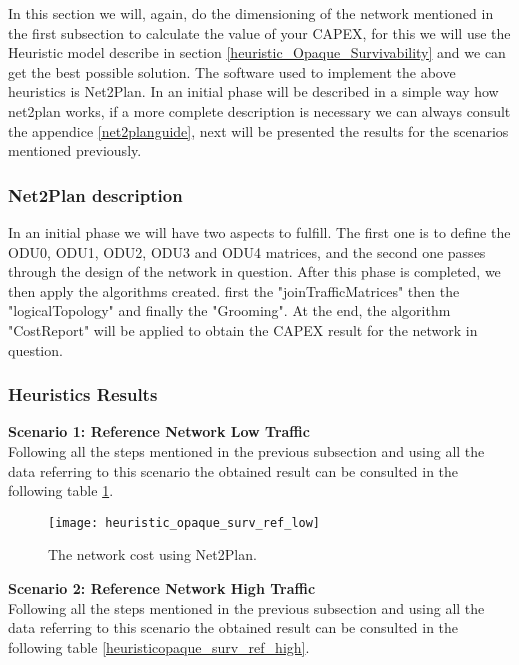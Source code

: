 \vspace{11pt}
In this section we will, again, do the dimensioning of the network mentioned in the first subsection to calculate the value of your CAPEX, for this we will use the Heuristic model describe in section \ref{heuristic_Opaque_Survivability} and we can get the best possible solution.
The software used to implement the above heuristics is Net2Plan.
In an initial phase will be described in a simple way how net2plan works, if a more complete description is necessary we can always consult the appendice \ref{net2planguide}, next will be presented the results for the scenarios mentioned previously.

\subsubsection{Net2Plan description}

In an initial phase we will have two aspects to fulfill. The first one is to define the ODU0, ODU1, ODU2, ODU3 and ODU4 matrices, and the second one passes through the design of the network in question.
After this phase is completed, we then apply the algorithms created. first the "joinTrafficMatrices" then the "logicalTopology" and finally the "Grooming".
At the end, the algorithm "CostReport" will be applied to obtain the CAPEX result for the network in question.

\subsubsection{Heuristics Results}

\textbf{Scenario 1: Reference Network Low Traffic}\\

Following all the steps mentioned in the previous subsection and using all the data referring to this scenario the obtained result can be consulted in the following table \ref{heuristicopaque_surv_ref_low}.

\begin{figure}[h!]
\centering
\texttt{[image: heuristic\_opaque\_surv\_ref\_low]}
\caption{The network cost using Net2Plan.}
\label{heuristicopaque_surv_ref_low}
\end{figure}


\textbf{Scenario 2: Reference Network High Traffic}\\

Following all the steps mentioned in the previous subsection and using all the data referring to this scenario the obtained result can be consulted in the following table \ref{heuristicopaque_surv_ref_high}.

